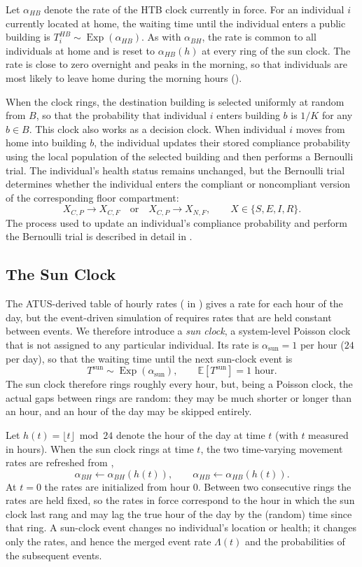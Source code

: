 \documentclass[11pt]{article}
\theoremstyle{definition}
\theoremstyle{plain}
\begin{document}
Let $\alpha_{HB}$ denote the rate of the HTB clock currently in force. For an individual $i$ currently located at home, the waiting time until the individual enters a public building is $T_i^{HB}\sim\operatorname{Exp}(\alpha_{HB})$. As with $\alpha_{BH}$, the rate is common to all individuals at home and is reset to $\alpha_{HB}(h)$ at every ring of the sun clock. The rate is close to zero overnight and peaks in the morning, so that individuals are most likely to leave home during the morning hours ().

When the clock rings, the destination building is selected uniformly at random from $B$, so that the probability that individual $i$ enters building $b$ is $1/K$ for any $b\in B$.
This clock also works as a decision clock. When individual $i$ moves from home into building $b$, the individual updates their stored compliance probability using the local population of the selected building and then performs a Bernoulli trial. The individual's health status remains unchanged, but the Bernoulli trial determines whether the individual enters the compliant or noncompliant version of the corresponding floor compartment:
\[
X_{C,P}\longrightarrow X_{C,F}
\quad\text{or}\quad
X_{C,P}\longrightarrow X_{N,F},
\qquad X\in\{S,E,I,R\}.
\]
The process used to update an individual's compliance probability and perform the Bernoulli trial is described in detail in .

\subsection{The Sun Clock}
\label{sec:sun}

The ATUS-derived table of hourly rates ( in ) gives a rate for each hour of the day, but the event-driven simulation of  requires rates that are held constant between events. We therefore introduce a \emph{sun clock}, a system-level Poisson clock that is not assigned to any particular individual. Its rate is $\alpha_{\mathrm{sun}}=1$ per hour ($24$ per day), so that the waiting time until the next sun-clock event is
\[
T^{\mathrm{sun}}\sim \operatorname{Exp}(\alpha_{\mathrm{sun}}),\qquad \mathbb{E}\left[T^{\mathrm{sun}}\right]=1\text{ hour}.
\]
The sun clock therefore rings roughly every hour, but, being a Poisson clock, the actual gaps between rings are random: they may be much shorter or longer than an hour, and an hour of the day may be skipped entirely.

Let $h(t)=\lfloor t\rfloor \bmod 24$ denote the hour of the day at time $t$ (with $t$ measured in hours). When the sun clock rings at time $t$, the two time-varying movement rates are refreshed from ,
\[
\alpha_{BH}\leftarrow\alpha_{BH}(h(t)),
\qquad
\alpha_{HB}\leftarrow\alpha_{HB}(h(t)).
\]
At $t=0$ the rates are initialized from hour $0$. Between two consecutive rings the rates are held fixed, so the rates in force correspond to the hour in which the sun clock last rang and may lag the true hour of the day by the (random) time since that ring. A sun-clock event changes no individual's location or health; it changes only the rates, and hence the merged event rate $\Lambda(t)$ and the probabilities of the subsequent events.
\end{document}
